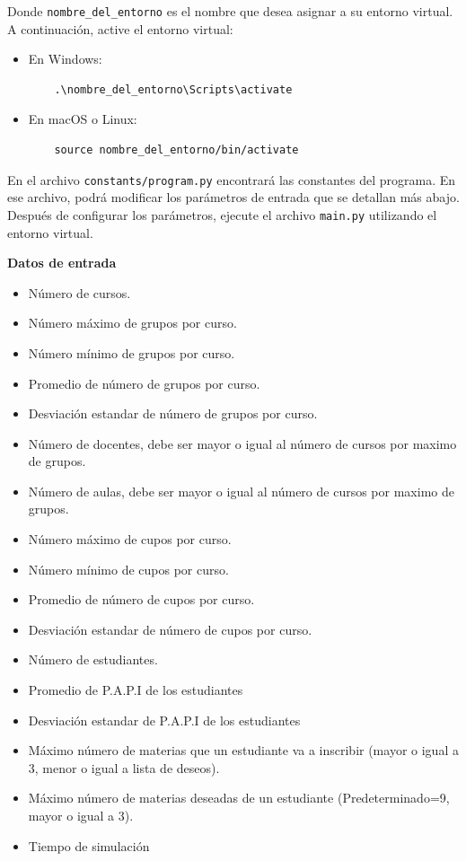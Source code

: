 \documentclass{article}
\begin{document}
Donde \texttt{nombre\_del\_entorno} es el nombre que desea asignar a su entorno virtual. 
A continuación, active el entorno virtual:

\begin{itemize}
  \item En Windows:
  \begin{verbatim}
    .\nombre_del_entorno\Scripts\activate
  \end{verbatim}
  \item En macOS o Linux:
  \begin{verbatim}
    source nombre_del_entorno/bin/activate
  \end{verbatim}
\end{itemize}

En el archivo \texttt{constants/program.py} encontrará las constantes del programa. 
En ese archivo, podrá modificar los parámetros de entrada que se detallan más abajo.\\

Después de configurar los parámetros, ejecute el archivo \texttt{main.py} utilizando 
el entorno virtual.

\textbf{Datos de entrada}

\begin{itemize}
  \item Número de cursos.
  \item Número máximo de grupos por curso.
  \item Número mínimo de grupos por curso.
  \item Promedio de número de grupos por curso.
  \item Desviación estandar de número de grupos por curso.
  \item Número de docentes, debe ser mayor o igual al número de cursos por maximo de grupos.
  \item Número de aulas, debe ser mayor o igual al número de cursos por maximo de grupos.
  \item Número máximo de cupos por curso.
  \item Número mínimo de cupos por curso.
  \item Promedio de número de cupos por curso.
  \item Desviación estandar de número de cupos por curso.
  \item Número de estudiantes.
  \item Promedio de P.A.P.I de los estudiantes
  \item Desviación estandar de P.A.P.I de los estudiantes
  \item Máximo número de materias que un estudiante va a inscribir (mayor o igual a 3, 
        menor o igual a lista de deseos).
  \item Máximo número de materias deseadas de un estudiante (Predeterminado=9, mayor o igual a 3).
  \item Tiempo de simulación
\end{itemize}
\end{document}
